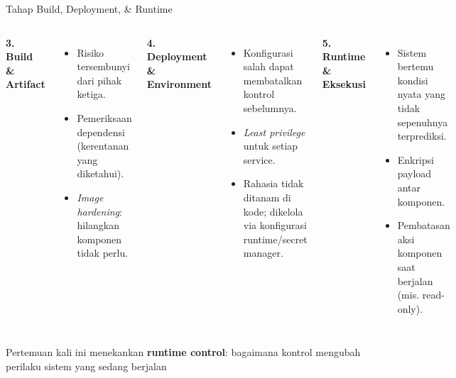 \documentclass[aspectratio=169, table]{beamer}
\begin{document}
\begin{frame}{Tahap Build, Deployment, \& Runtime}
	\vspace{18pt}
	\begin{columns}[T]
		\textbf{3. Build \& Artifact}
		\begin{itemize}
			\item Risiko tersembunyi dari pihak ketiga.
			\item Pemeriksaan dependensi (kerentanan yang diketahui).
			\item \emph{Image hardening}: hilangkan komponen tidak perlu.
		\end{itemize}
		
		\textbf{4. Deployment \& Environment}
		\begin{itemize}
			\item Konfigurasi salah dapat membatalkan kontrol sebelumnya.
			\item \emph{Least privilege} untuk setiap service.
			\item Rahasia tidak ditanam di kode; dikelola via konfigurasi runtime/secret manager.
		\end{itemize}
		
		\textbf{5. Runtime \& Eksekusi}
		\begin{itemize}
			\item Sistem bertemu kondisi nyata yang tidak sepenuhnya terprediksi.
			\item Enkripsi payload antar komponen.
			\item Pembatasan aksi komponen saat berjalan (mis. read-only).
		\end{itemize}
	\end{columns}
	
	\vspace{6pt}
	{\footnotesize Pertemuan kali ini menekankan \textbf{runtime control}: bagaimana kontrol mengubah perilaku sistem yang sedang berjalan}
\end{frame}
\end{document}
